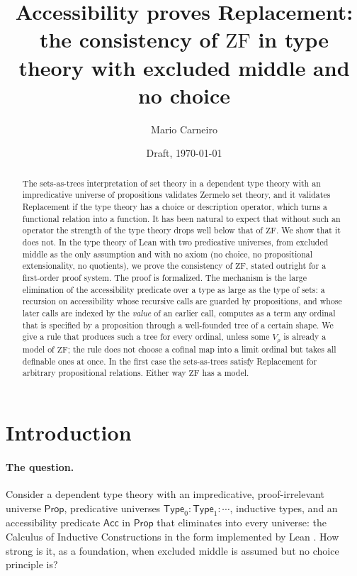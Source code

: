 \documentclass[10pt]{article}
\theoremstyle{definition}
\theoremstyle{remark}
\newcommand{\Prop}{\mathsf{Prop}}
\newcommand{\Type}{\mathsf{Type}}
\newcommand{\ZF}{\mathrm{ZF}}
\newcommand{\Acc}{\mathsf{Acc}}
\begin{document}
\title{Accessibility proves Replacement:\\
  \large the consistency of $\ZF$ in type theory with excluded middle and no choice}
\author{Mario Carneiro}
\date{Draft, \today}
\maketitle

\begin{abstract}
The sets-as-trees interpretation of set theory in a dependent type
theory with an impredicative universe of propositions validates
Zermelo set theory, and it validates Replacement if the type theory
has a choice or description operator, which turns a functional relation
into a function. It has been natural to expect that without such an
operator the strength of the type theory drops well below that of $\ZF$. We
show that it does not. In the type theory of Lean with two predicative
universes, from excluded middle as the only assumption and with no
axiom (no choice, no propositional extensionality, no quotients), we
prove the consistency of $\ZF$, stated outright for a first-order proof
system. The proof is formalized. The mechanism is the large elimination
of the accessibility predicate over a type as large as the type of
sets: a recursion on accessibility whose recursive calls are guarded by
propositions, and whose later calls are indexed by the \emph{value} of
an earlier call, computes as a term any ordinal that is specified by a
proposition through a well-founded tree of a certain shape. We give a
rule that produces such a tree for every ordinal, unless some $V_\rho$ is
already a model of $\ZF$; the rule does not choose a cofinal map into a
limit ordinal but takes all definable ones at once. In the first case
the sets-as-trees satisfy Replacement for arbitrary propositional
relations. Either way $\ZF$ has a model.
\end{abstract}

\section{Introduction}

\paragraph{The question.}
Consider a dependent type theory with an impredicative, proof-irrelevant
universe $\Prop$, predicative universes $\Type_0:\Type_1:\cdots$,
inductive types, and an accessibility predicate $\Acc$ in $\Prop$ that
eliminates into every universe: the Calculus of Inductive Constructions
in the form implemented by Lean \cite{lean4,carneiro19}. How strong is
it, as a foundation, when excluded middle is assumed but no choice
principle is?
\end{document}
